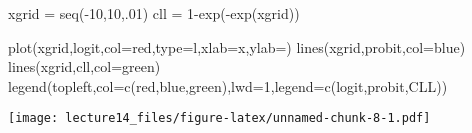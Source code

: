 \documentclass[
]{article}
\newenvironment{Shaded}{\begin{snugshade}}{\end{snugshade}}
\newcommand{\AttributeTok}[1]{\textcolor[rgb]{0.77,0.63,0.00}{#1}}
\newcommand{\DecValTok}[1]{\textcolor[rgb]{0.00,0.00,0.81}{#1}}
\newcommand{\FunctionTok}[1]{\textcolor[rgb]{0.00,0.00,0.00}{#1}}
\newcommand{\NormalTok}[1]{#1}
\newcommand{\OtherTok}[1]{\textcolor[rgb]{0.56,0.35,0.01}{#1}}
\newcommand{\SpecialCharTok}[1]{\textcolor[rgb]{0.00,0.00,0.00}{#1}}
\newcommand{\StringTok}[1]{\textcolor[rgb]{0.31,0.60,0.02}{#1}}
\begin{document}
\begin{Shaded}
\begin{Highlighting}[]
\NormalTok{xgrid }\OtherTok{=} \FunctionTok{seq}\NormalTok{(}\SpecialCharTok{{-}}\DecValTok{10}\NormalTok{,}\DecValTok{10}\NormalTok{,.}\DecValTok{01}\NormalTok{)}
\NormalTok{cll }\OtherTok{=} \DecValTok{1}\SpecialCharTok{{-}}\FunctionTok{exp}\NormalTok{(}\SpecialCharTok{{-}}\FunctionTok{exp}\NormalTok{(xgrid))}

\FunctionTok{plot}\NormalTok{(xgrid,logit,}\AttributeTok{col=}\StringTok{\textquotesingle{}red\textquotesingle{}}\NormalTok{,}\AttributeTok{type=}\StringTok{\textquotesingle{}l\textquotesingle{}}\NormalTok{,}\AttributeTok{xlab=}\StringTok{\textquotesingle{}x\textquotesingle{}}\NormalTok{,}\AttributeTok{ylab=}\StringTok{\textquotesingle{}\textquotesingle{}}\NormalTok{)}
\FunctionTok{lines}\NormalTok{(xgrid,probit,}\AttributeTok{col=}\StringTok{\textquotesingle{}blue\textquotesingle{}}\NormalTok{)}
\FunctionTok{lines}\NormalTok{(xgrid,cll,}\AttributeTok{col=}\StringTok{\textquotesingle{}green\textquotesingle{}}\NormalTok{)}
\FunctionTok{legend}\NormalTok{(}\StringTok{\textquotesingle{}topleft\textquotesingle{}}\NormalTok{,}\AttributeTok{col=}\FunctionTok{c}\NormalTok{(}\StringTok{\textquotesingle{}red\textquotesingle{}}\NormalTok{,}\StringTok{\textquotesingle{}blue\textquotesingle{}}\NormalTok{,}\StringTok{\textquotesingle{}green\textquotesingle{}}\NormalTok{),}\AttributeTok{lwd=}\DecValTok{1}\NormalTok{,}\AttributeTok{legend=}\FunctionTok{c}\NormalTok{(}\StringTok{\textquotesingle{}logit\textquotesingle{}}\NormalTok{,}\StringTok{\textquotesingle{}probit\textquotesingle{}}\NormalTok{,}\StringTok{\textquotesingle{}CLL\textquotesingle{}}\NormalTok{))}
\end{Highlighting}
\end{Shaded}

\texttt{[image: lecture14\_files/figure-latex/unnamed-chunk-8-1.pdf]}

\begin{Shaded}
\end{Shaded}
\end{document}
